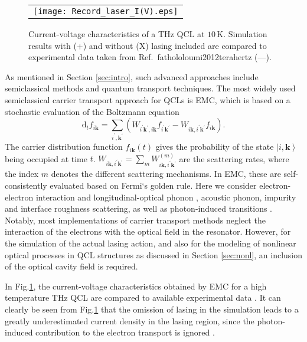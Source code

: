 \documentclass[a4paper]{spie}%
\begin{document}
\begin{figure}[th]
\begin{center}%
\begin{tabular}
[c]{c}%
\texttt{[image: Record\_laser\_I(V).eps]}%
\end{tabular}
\end{center}
\caption[example]{Current-voltage characteristics of a THz QCL at
$10\,\mathrm{K}$. Simulation results with (+) and without (X) lasing included
are compared to experimental data taken from Ref.$\,$\citenum
{fathololoumi2012terahertz} (---).}%
\label{fig:QCL}%
\end{figure}

As mentioned in Section \ref{sec:intro}, such advanced approaches include
semiclassical methods and quantum transport techniques. The most widely used
semiclassical carrier transport approach for QCLs is EMC, which is based on a
stochastic evaluation of the Boltzmann equation%
\begin{equation}
\mathrm{d}_{t}f_{i\mathbf{k}}=\sum_{i^{\prime},\mathbf{k}^{\prime}}\left(
W_{i^{\prime}\mathbf{k}^{\prime},i\mathbf{k}}f_{i^{\prime}\mathbf{k}^{\prime}%
}-W_{i\mathbf{k},i^{\prime}\mathbf{k}^{\prime}}f_{i\mathbf{k}}\right)
.\label{eq:boltz}%
\end{equation}
The carrier distribution function $f_{i\mathbf{k}}\left(  t\right)  $ gives
the probability of the state $\left|  i,\mathbf{k}\right\rangle $ being
occupied at time $t$. $W_{i\mathbf{k},i^{\prime}\mathbf{k}^{\prime}}=\sum
_{m}W_{i\mathbf{k},i^{\prime}\mathbf{k}^{\prime}}^{\left(  m\right)  }$ are
the scattering rates, where the index $m$ denotes the different scattering
mechanisms. In EMC, these are self-consistently evaluated based on Fermi`s
golden rule. Here we consider electron-electron interaction
\cite{2010JAP...107a3104J} and longitudinal-optical phonon
\cite{ezhov2016influence}, acoustic phonon, impurity and interface roughness
scattering, as well as photon-induced transitions
\cite{2010ApPhL..96a1103J,jirauschek2010monte}. Notably, most implementations
of carrier transport methods neglect the interaction of the electrons with the
optical field in the resonator. However, for the simulation of the actual
lasing action, and also for the modeling of nonlinear optical processes in QCL
structures as discussed in Section \ref{sec:nonl}, an inclusion of the optical
cavity field is required.

In Fig.\thinspace\ref{fig:QCL}, the current-voltage characteristics obtained
by EMC for a high temperature THz QCL are compared to available experimental
data \cite{fathololoumi2012terahertz}. It can clearly be seen from
Fig.\thinspace\ref{fig:QCL} that the omission of lasing in the simulation
leads to a greatly underestimated current density in the lasing region, since
the photon-induced contribution to the electron transport is ignored
\cite{matyas2011photon}.
\end{document}
